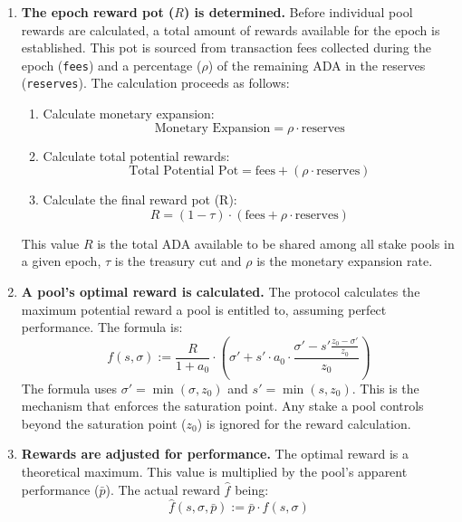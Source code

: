 \documentclass[11pt, letterpaper]{article}
\begin{document}
\begin{enumerate}
	\item \textbf{The epoch reward pot ($R$) is determined.} Before individual pool rewards are calculated, a
	      total amount of rewards available for the epoch is established. This pot is sourced from transaction fees
	      collected during the epoch (\texttt{fees}) and a percentage ($\rho$) of the remaining ADA in the reserves
	      (\texttt{reserves}). The calculation proceeds as follows:
	      \begin{enumerate}
		      \item Calculate monetary expansion: \[ \text{Monetary Expansion} = \rho \cdot \text{reserves} \]
		      \item Calculate total potential rewards:
		            \[ \text{Total Potential Pot} = \text{fees} + (\rho \cdot \text{reserves}) \]
		      \item Calculate the final reward pot (R):
		            \[ R = (1 - \tau) \cdot (\text{fees} + \rho \cdot \text{reserves}) \]
	      \end{enumerate}
	      This value $R$ is the total ADA available to be shared among all stake pools in a given epoch, $\tau$ is the treasury cut 
		  and $\rho$ is the monetary expansion rate.

	\item \textbf{A pool's optimal reward is calculated.} The protocol calculates the maximum potential reward
	      a pool is entitled to, assuming perfect performance. The formula is:
	      \[ f(s, \sigma) := \frac{R}{1+a_0} \cdot
		      \left(\sigma' + s' \cdot a_0 \cdot \frac{\sigma' - s' \frac{z_0 - \sigma'}{z_0}}{z_0}\right) \]
	      The formula uses $\sigma' = \min(\sigma, z_0)$ and $s' = \min(s, z_0)$. This is
	      the mechanism that enforces the saturation point. Any stake a pool controls
	      beyond the saturation point ($z_{0}$) is ignored for the reward calculation.

	\item \textbf{Rewards are adjusted for performance.} The optimal reward is a theoretical maximum. This value
	      is multiplied by the pool's apparent performance ($\bar{p}$). The actual reward $\hat{f}$ being:
	      \[ \hat{f}(s, \sigma, \bar{p}) := \bar{p} \cdot f(s, \sigma) \]


\end{enumerate}
\end{document}
